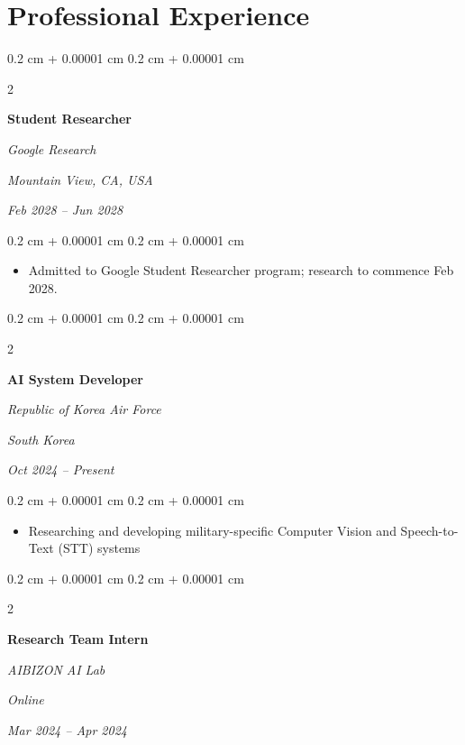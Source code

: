 \documentclass[10pt, letterpaper]{article}
\newenvironment{highlights}{
    \begin{itemize}[
        topsep=0.10 cm,
        parsep=0.10 cm,
        partopsep=0pt,
        itemsep=0pt,
        leftmargin=0.4 cm + 10pt
    ]
}{
    \end{itemize}
} %
\newenvironment{onecolentry}{
    \begin{adjustwidth}{
        0.2 cm + 0.00001 cm
    }{
        0.2 cm + 0.00001 cm
    }
}{
    \end{adjustwidth}
} %
\newenvironment{twocolentry}[2][]{
    \onecolentry
    \def\secondColumn{#2}
    \setcolumnwidth{\fill, 4.5 cm}
    \begin{paracol}{2}
}{
    \switchcolumn \raggedleft \secondColumn
    \end{paracol}
    \endonecolentry
} %
\begin{document}
        \vspace{0.2 cm}
    
    \section{Professional Experience}
        
        \begin{twocolentry}{
        \textit{Mountain View, CA, USA}    
            
        \textit{Feb 2028 – Jun 2028}}
            \textbf{Student Researcher}
            
            \textit{Google Research}
        \end{twocolentry}

        \vspace{0.10 cm}
        \begin{onecolentry}
            \begin{highlights}
                \item Admitted to Google Student Researcher program; research to commence Feb 2028.
            \end{highlights}
        \end{onecolentry}

        \vspace{0.2 cm}

        \begin{twocolentry}{
        \textit{South Korea}    
            
        \textit{Oct 2024 – Present}}
            \textbf{AI System Developer}
            
            \textit{Republic of Korea Air Force}
        \end{twocolentry}

        \vspace{0.10 cm}
        \begin{onecolentry}
            \begin{highlights}
                \item Researching and developing military-specific Computer Vision and Speech-to-Text (STT) systems
            \end{highlights}
        \end{onecolentry}

        \vspace{0.2 cm}

        \begin{twocolentry}{
        \textit{Online}    
            
        \textit{Mar 2024 – Apr 2024}}
            \textbf{Research Team Intern}
            
            \textit{AIBIZON AI Lab}
        \end{twocolentry}
\end{document}
